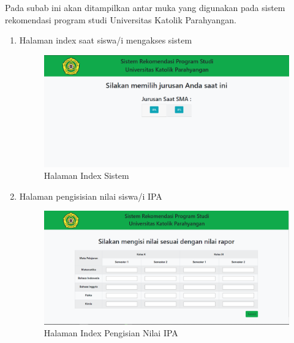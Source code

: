 Pada subab ini akan ditampilkan antar muka yang digunakan pada sistem rekomendasi program studi Universitas Katolik Parahyangan.

\begin{enumerate}
    \item Halaman index saat siswa/i mengakses sistem
    
    \begin{figure}[H]
        \centering
        \includegraphics[width = 12cm, height =8 cm]{Gambar/gambar51.png}
        \caption{Halaman Index Sistem}
        \label{fig:gambar51}
    \end{figure}
    
    \item Halaman pengisisian nilai siswa/i IPA
    
    \begin{figure}[H]
        \centering
        \includegraphics[width = 12cm, height =8 cm]{Gambar/gambar52.png}
        \caption{Halaman Index Pengisian Nilai IPA}
        \label{fig:gambar52}
    \end{figure}
    

\end{enumerate}
